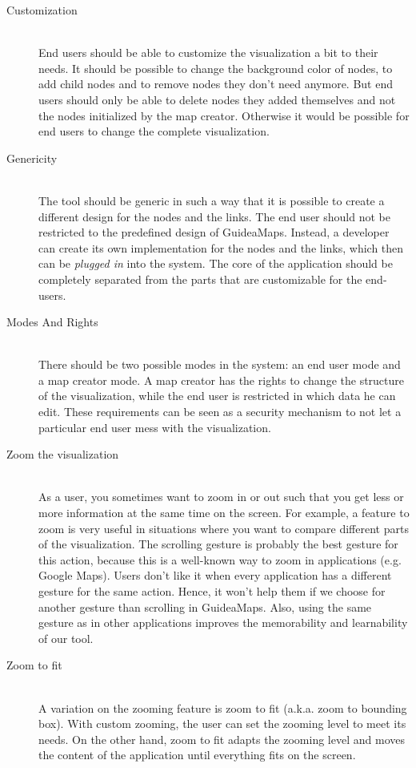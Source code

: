 \begin{description}
	
	\item[Customization] \hfill \\
	End users should be able to customize the visualization a bit to their needs. It should be possible to change the background color of nodes, to add child nodes and to remove nodes they don't need anymore. But end users should only be able to delete nodes they added themselves and not the nodes initialized by the map creator. Otherwise it would be possible for end users to change the complete visualization.
  
	\item[Genericity] \hfill \\
  The tool should be generic in such a way that it is possible to create a different design for the nodes and the links. The end user should not be restricted to the predefined design of GuideaMaps. Instead, a developer can create its own implementation for the nodes and the links, which then can be \textit{plugged in} into the system. The core of the application should be completely separated from the parts that are customizable for the end-users.
  
	\item[Modes And Rights] \hfill \\
	There should be two possible modes in the system: an end user mode and a map creator mode. A map creator has the rights to change the structure of the visualization, while the end user is restricted in which data he can edit. These requirements can be seen as a security mechanism to not let a particular end user mess with the visualization.
  
	\item[Zoom the visualization] \hfill \\
	As a user, you sometimes want to zoom in or out such that you get less or more information at the same time on the screen. For example, a feature to zoom is very useful in situations where you want to compare different parts of the visualization. The scrolling gesture is probably the best gesture for this action, because this is a well-known way to zoom in applications (e.g. Google Maps). Users don't like it when every application has a different gesture for the same action. Hence, it won't help them if we choose for another gesture than scrolling in GuideaMaps. Also, using the same gesture as in other applications improves the memorability and learnability of our tool.
	
	\item[Zoom to fit] \hfill \\
	A variation on the zooming feature is zoom to fit (a.k.a. zoom to bounding box). With custom zooming, the user can set the zooming level to meet its needs. On the other hand, zoom to fit adapts the zooming level and moves the content of the application until everything fits on the screen. 
  
\end{description}




